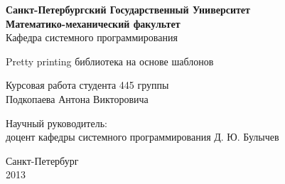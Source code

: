 \begin{titlepage}
\newpage

\begin{center}
	\textbf{
		Санкт-Петербургский Государственный Университет \\
		Математико-механический факультет \\
	}
	Кафедра системного программирования
\end{center}

\vspace{15em}

\begin{center}
\Large Pretty printing библиотека на основе шаблонов \\ 
\end{center}

\vspace{2em}

\begin{center}
Курсовая работа студента 445 группы \\
Подкопаева Антона Викторовича

\end{center}

\vspace{10em}

Научный руководитель:\\
доцент кафедры системного программирования \dotfill
Д. Ю. Булычев



\vspace{\fill}

\begin{center}
Санкт-Петербург \\2013
\end{center}

\end{titlepage}